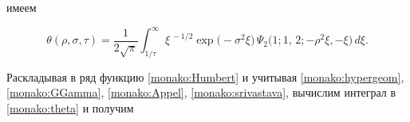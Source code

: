 имеем

\begin{equation}

\label{monako:theta}

\theta(\rho, \sigma, \tau)=\frac{1}{2\sqrt{\pi}}\int _{1/\tau}^\infty \xi^{\,-1/2}\exp\big(-\sigma^2\xi\big)\,\Psi_2\big(1;1,\,2;-\rho^2\xi,-\xi\big)\,d\xi.

\end{equation}

Раскладывая в ряд функцию \eqref{monako:Humbert} и учитывая \eqref{monako:hypergeom}, \eqref{monako:GGamma}, \eqref{monako:Appel}, \eqref{monako:srivastava}, вычислим интеграл в  \eqref{monako:theta} и получим









